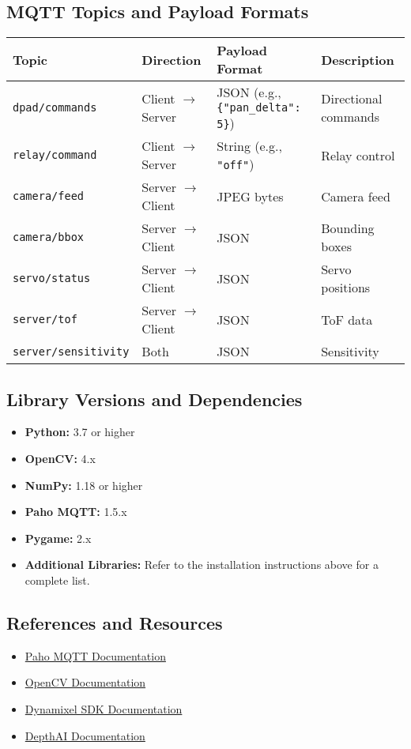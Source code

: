 \documentclass[12pt]{article}
\begin{document}
\subsection{MQTT Topics and Payload Formats}
\begin{center}
\begin{tabular}{|l|l|l|p{3cm}|}
\hline
\textbf{Topic} & \textbf{Direction} & \textbf{Payload Format} & \textbf{Description} \\
\hline
\texttt{dpad/commands} & Client $\rightarrow$ Server & JSON (e.g., \verb|{"pan_delta": 5}|) & Directional commands \\
\hline
\texttt{relay/command} & Client $\rightarrow$ Server & String (e.g., \verb|"off"|) & Relay control \\
\hline
\texttt{camera/feed} & Server $\rightarrow$ Client & JPEG bytes & Camera feed \\
\hline
\texttt{camera/bbox} & Server $\rightarrow$ Client & JSON & Bounding boxes \\
\hline
\texttt{servo/status} & Server $\rightarrow$ Client & JSON & Servo positions \\
\hline
\texttt{server/tof} & Server $\rightarrow$ Client & JSON & ToF data \\
\hline
\texttt{server/sensitivity} & Both & JSON & Sensitivity \\
\hline
\end{tabular}
\end{center}

\subsection{Library Versions and Dependencies}
\begin{itemize}[leftmargin=*, label={--}]
    \item \textbf{Python:} 3.7 or higher
    \item \textbf{OpenCV:} 4.x
    \item \textbf{NumPy:} 1.18 or higher
    \item \textbf{Paho MQTT:} 1.5.x
    \item \textbf{Pygame:} 2.x
    \item \textbf{Additional Libraries:} Refer to the installation instructions above for a complete list.
\end{itemize}

\subsection{References and Resources}
\begin{itemize}[leftmargin=*, label={--}]
    \item \href{https://www.eclipse.org/paho/}{Paho MQTT Documentation}
    \item \href{https://docs.opencv.org/}{OpenCV Documentation}
    \item \href{https://emanual.robotis.com/docs/en/software/dynamixel/dynamixel_sdk/}{Dynamixel SDK Documentation}
    \item \href{https://docs.luxonis.com/}{DepthAI Documentation}
\end{itemize}
\end{document}
